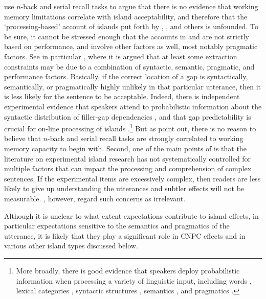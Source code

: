 \documentclass[output=paper]{langsci/langscibook}
\begin{document}
 
  \citet{sprouse12} use $n$-back and serial recall tasks to argue that there is no evidence that working
  memory limitations correlate with island acceptability, and therefore that the `processing-based'
  account of islands put forth by  \citet{kluender92,kluender}, \citet{kluenderkustas}, \citep{hofsaglang} and others is unfounded. To be sure, it cannot be stressed enough that the accounts in \citet{kluender92} and \citep{hofsaglang} are  not strictly based on performance, and involve other factors as well, most notably pragmatic factors. See in particular \citet[49]{hoflangreply}, where it is argued that at least some extraction constraints may be due to a combination of syntactic, semantic, pragmatic, and performance factors.  Basically, if the correct location of a gap is syntactically, semantically, or pragmatically highly unlikely in that particular utterance, then it is less likely for the sentence to be acceptable.  Indeed, there is independent experimental evidence that  speakers attend to  probabilistic information about the syntactic distribution of  filler-gap dependencies \citep{culcogsci},  and that gap  predictability  is crucial for on-line processing of islands \citep{michelt}.\footnote{More broadly, there is good  evidence that  speakers deploy probabilistic information when  processing a variety of linguistic input, including words \citep{altman99,arai,creel,delong,kutas84},  lexical categories \citep{gibson07,levy13,tabor97},  syntactic structures \citep{levyted,lau06,levy08,staub},  semantics \citep{altman99,federmeier,kamide03}, and pragmatics \citep{shankweiler,mak,roland12}.} But as \citet{reply2} point out, there is no reason to believe  that $n$-back and serial recall tasks are strongly correlated to working memory capacity to begin with. Second, one of the main points of \citep{hofsaglang} is that the literature  on experimental  island research has not systematically controlled for multiple factors that can impact the processing and comprehension of complex sentences. If the experimental items are excessively  complex, then readers are less likely to give up understanding the utterances and subtler effects  will not be measurable.  \citet{phil13}, however, regard such concerns as irrelevant.
  
  Although it is unclear to what extent expectations contribute to island effects, in particular expectations sensitive to the semantics and pragmatics of the utterance, it is likely that they play a significant role in CNPC effects and in various other island types discussed below.
\end{document}
